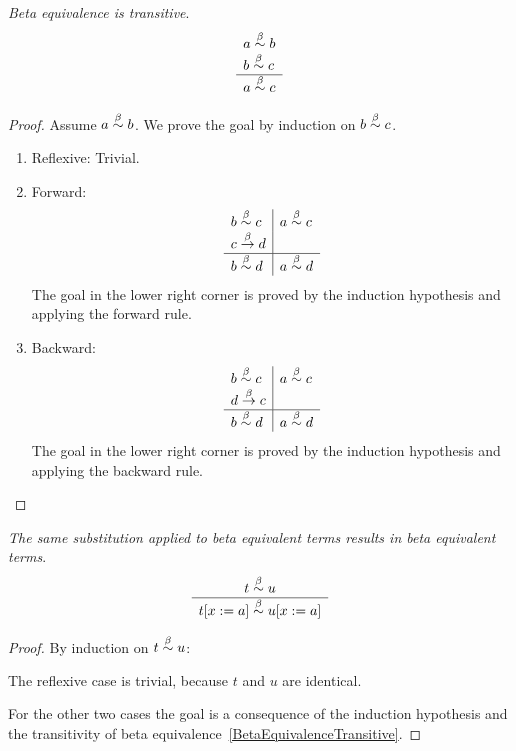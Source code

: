 \begin{theorem}
    \label{BetaEquivalenceTransitive}
    \emph{Beta equivalence is transitive}.
    $$
    \begin{array}{l} a \stackrel{\beta}{\sim} b \\ b \stackrel{\beta}{\sim} c \\ \hline a \stackrel{\beta}{\sim} c\end{array}
    $$
    \begin{proof}
        Assume $a \stackrel{\beta}{\sim} b$. We prove the goal by induction on $b \stackrel{\beta}{\sim}
        c$.
        \begin{enumerate}
        \item Reflexive: Trivial.

        \item Forward:
            $$
            \begin{array}{l|l}
                b \stackrel{\beta}{\sim} c
                &
                a \stackrel{\beta}{\sim} c
                \\
                c \stackrel{\beta}{\to} d
                \\
                \hline
                b \stackrel{\beta}{\sim} d
                &
                a \stackrel{\beta}{\sim} d
            \end{array}
            $$
            The goal in the lower right corner is proved by the induction
                hypothesis and applying the forward rule.

        \item Backward:
            $$
            \begin{array}{l|l}
                b \stackrel{\beta}{\sim} c
                &
                a \stackrel{\beta}{\sim} c
                \\
                d \stackrel{\beta}{\to} c
                \\
                \hline
                b \stackrel{\beta}{\sim} d
                &
                a \stackrel{\beta}{\sim} d
            \end{array}
            $$
            The goal in the lower right corner is proved by the induction
                hypothesis and applying the backward rule.
        \end{enumerate}
    \end{proof}
\end{theorem}

\begin{theorem}
    \label{SubstituteEquivalence}
    \emph{The same substitution applied to beta equivalent terms results in beta
    equivalent terms}.
    $$
    \begin{array}{c} 
        t \stackrel{\beta}{\sim} u
     \\ \hline 
        t[x:=a] \stackrel{\beta}{\sim} u[x:=a]
    \end{array}
    $$

    \begin{proof}
        By induction on $t \stackrel{\beta}{\sim} u$:

        The reflexive case is trivial, because $t$ and $u$ are identical.

        For the other two cases the goal is a consequence of the induction
        hypothesis and the transitivity of beta
        equivalence~\ref{BetaEquivalenceTransitive}.
    \end{proof}
\end{theorem}
